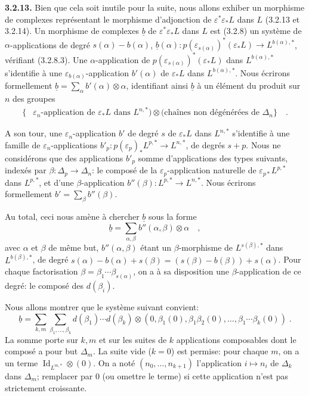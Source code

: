 \documentclass[12pt,a4paper]{article}
\theoremstyle{plain}
\theoremstyle{definition}
\DeclareMathOperator{\Id}{Id}
\begin{document}
\noindent\textbf{3.2.13.} Bien que cela soit inutile pour la suite, nous allons exhiber un morphisme de complexes repr\'{e}sentant le morphisme d'adjonction de $\varepsilon^{*}\varepsilon_{*}L$ dans $L$ (3.2.13 et 3.2.14). Un morphisme de complexes $\underline{b}$ de $\varepsilon^{*}\varepsilon_{*}L$ dans $L$ est (3.2.8) un syst\`{e}me de $\alpha$-applications de degr\'{e} $s(\alpha)-b(\alpha)$, $\underline{b}(\alpha): p(\varepsilon_{s(\alpha)})^{*}(\varepsilon_{*}L) \longrightarrow L^{b(\alpha),*}$, v\'{e}rifiant (3.2.8.3). Une $\alpha$-application de $p(\varepsilon_{s(\alpha)})^{*}(\varepsilon_{*}L)$ dans $L^{b(\alpha),*}$ s'identifie \`{a} une $\varepsilon_{b(\alpha)}$-application $b'(\alpha)$ de $\varepsilon_{*}L$ dans $L^{b(\alpha),*}$. Nous \'{e}crirons formellement $\underline{b} = \sum_{\alpha} b'(\alpha) \otimes \alpha$, identifiant ainsi $\underline{b}$ \`{a} un \'{e}l\'{e}ment du produit sur $n$ des groupes
\begin{align*}
\{&\varepsilon_{n}\text{-application de }\varepsilon_{*}L\text{ dans }L^{n,*}) \otimes (\text{cha\^{i}nes non d\'{e}g\'{e}n\'{e}r\'{e}es de }\Delta_{n}\}\quad.
\end{align*}

A son tour, une $\varepsilon_{n}$-application $b'$ de degr\'{e} $s$ de $\varepsilon_{*}L$ dans $L^{n,*}$ s'identifie \`{a} une famille de $\varepsilon_{n}$-applications $b'_{p}: p(\varepsilon_{p})_{*}L^{p,*} \longrightarrow L^{n,*}$, de degr\'{e}s $s+p$. Nous ne consid\'{e}rons que des applications $b'_{p}$ somme d'applications des types suivants, index\'{e}s par $\beta: \Delta_{p} \to \Delta_{n}$: le compos\'{e} de la $\varepsilon_{p}$-application naturelle de $\varepsilon_{p*}L^{p,*}$ dans $L^{p,*}$, et d'une $\beta$-application $b''(\beta): L^{p,*} \longrightarrow L^{n,*}$. Nous \'{e}crirons formellement $b' = \sum_{\beta} b''(\beta)$.

Au total, ceci nous am\`{e}ne \`{a} chercher $\underline{b}$ sous la forme
\[
\underline{b} = \sum_{\alpha,\beta} b''(\alpha,\beta) \otimes \alpha\quad,
\]
avec $\alpha$ et $\beta$ de m\^{e}me but, $b''(\alpha,\beta)$ \'{e}tant un $\beta$-morphisme de $L^{s(\beta),*}$ dans $L^{b(\beta),*}$, de degr\'{e} $s(\alpha)-b(\alpha)+s(\beta) = (s(\beta)-b(\beta)) + s(\alpha)$. Pour chaque factorisation $\beta = \beta_{1} \cdots \beta_{s(\alpha)}$, on a \`{a} sa disposition une $\beta$-application de ce degr\'{e}: le compos\'{e} des $d(\beta_{i})$.

Nous allons montrer que le syst\`{e}me suivant convient:
\begin{equation}\label{eq:3.2.13.1}
\underline{b} = \sum_{k,m} \sum_{\beta_{1},\ldots,\beta_{k}} d(\beta_{1}) \cdots d(\beta_{k}) \otimes (0, \beta_{1}(0), \beta_{1}\beta_{2}(0), \ldots, \beta_{1}\cdots\beta_{k}(0))\;.
\end{equation}
La somme porte sur $k,m$ et sur les suites de $k$ applications composables dont le compos\'{e} a pour but $\Delta_{m}$. La suite vide ($k=0$) est permise: pour chaque $m$, on a un terme $\Id_{L^{m,*}} \otimes (0)$. On a not\'{e} $(n_{0},\ldots,n_{k+1})$ l'application $i \mapsto n_{i}$ de $\Delta_{k}$ dans $\Delta_{m}$; remplacer par $0$ (ou omettre le terme) si cette application n'est pas strictement croissante.
\end{document}
